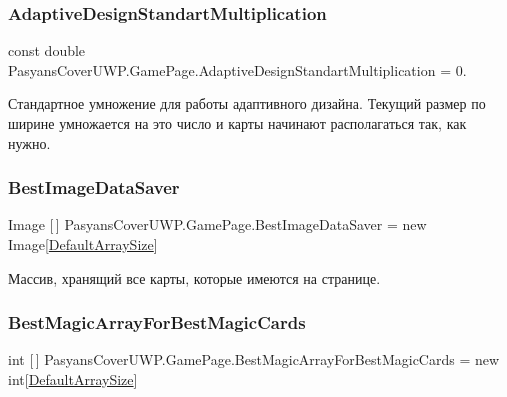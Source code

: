 \subsubsection{\texorpdfstring{Adaptive\+Design\+Standart\+Multiplication}{AdaptiveDesignStandartMultiplication}}
{\footnotesize\ttfamily const double Pasyans\+Cover\+U\+W\+P.\+Game\+Page.\+Adaptive\+Design\+Standart\+Multiplication = 0.\hspace{0.3cm}{\ttfamily [private]}}



Стандартное умножение для работы адаптивного дизайна. Текущий размер по ширине умножается на это число и карты начинают располагаться так, как нужно. 

\mbox{\label{class_pasyans_cover_u_w_p_1_1_game_page_a128b0510c61dbb4bc48f6fadffe2cbf8}} 
\subsubsection{\texorpdfstring{Best\+Image\+Data\+Saver}{BestImageDataSaver}}
{\footnotesize\ttfamily Image \mbox{[}$\,$\mbox{]} Pasyans\+Cover\+U\+W\+P.\+Game\+Page.\+Best\+Image\+Data\+Saver = new Image\mbox{[}\hyperlink{class_pasyans_cover_u_w_p_1_1_game_page_af512b41a55021eba0dafb53dac089916}{Default\+Array\+Size}\mbox{]}\hspace{0.3cm}{\ttfamily [private]}}



Массив, хранящий все карты, которые имеются на странице. 

\mbox{\label{class_pasyans_cover_u_w_p_1_1_game_page_a4749dec0871a8794a50eace45a1f6db1}} 
\subsubsection{\texorpdfstring{Best\+Magic\+Array\+For\+Best\+Magic\+Cards}{BestMagicArrayForBestMagicCards}}
{\footnotesize\ttfamily int \mbox{[}$\,$\mbox{]} Pasyans\+Cover\+U\+W\+P.\+Game\+Page.\+Best\+Magic\+Array\+For\+Best\+Magic\+Cards = new int\mbox{[}\hyperlink{class_pasyans_cover_u_w_p_1_1_game_page_af512b41a55021eba0dafb53dac089916}{Default\+Array\+Size}\mbox{]}\hspace{0.3cm}{\ttfamily [private]}}



